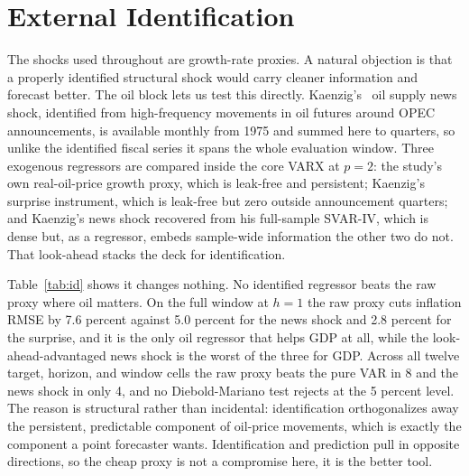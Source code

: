 \documentclass[conference]{IEEEtran}
\begin{document}
\section{External Identification}
The shocks used throughout are growth-rate proxies. A natural objection is that a properly identified structural shock would carry cleaner information and forecast better. The oil block lets us test this directly. Kaenzig's~\cite{kanzig2021} oil supply news shock, identified from high-frequency movements in oil futures around OPEC announcements, is available monthly from 1975 and summed here to quarters, so unlike the identified fiscal series it spans the whole evaluation window. Three exogenous regressors are compared inside the core VARX at $p=2$: the study's own real-oil-price growth proxy, which is leak-free and persistent; Kaenzig's surprise instrument, which is leak-free but zero outside announcement quarters; and Kaenzig's news shock recovered from his full-sample SVAR-IV, which is dense but, as a regressor, embeds sample-wide information the other two do not. That look-ahead stacks the deck for identification.

Table~\ref{tab:id} shows it changes nothing. No identified regressor beats the raw proxy where oil matters. On the full window at $h=1$ the raw proxy cuts inflation RMSE by 7.6 percent against 5.0 percent for the news shock and 2.8 percent for the surprise, and it is the only oil regressor that helps GDP at all, while the look-ahead-advantaged news shock is the worst of the three for GDP. Across all twelve target, horizon, and window cells the raw proxy beats the pure VAR in 8 and the news shock in only 4, and no Diebold-Mariano test rejects at the 5 percent level. The reason is structural rather than incidental: identification orthogonalizes away the persistent, predictable component of oil-price movements, which is exactly the component a point forecaster wants. Identification and prediction pull in opposite directions, so the cheap proxy is not a compromise here, it is the better tool.
\end{document}
